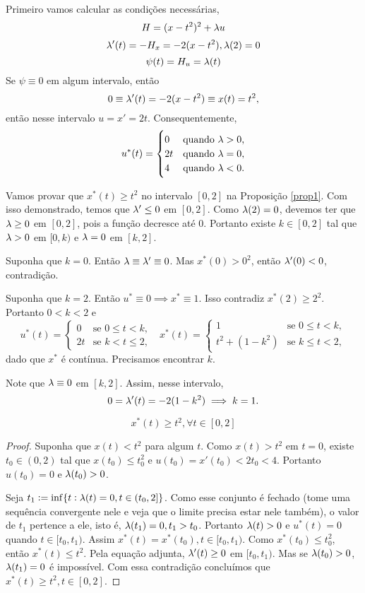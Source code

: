 Primeiro vamos calcular as condições necessárias, 
$$
H = (x - t^2)^2 + \lambda u 
$$
$$
\lambda '(t) = -H_x = -2(x - t^2), \lambda(2) = 0
$$
$$
\psi(t) = H_u = \lambda(t)
$$
Se $\psi \equiv 0$ em algum intervalo, então 
$$
0 \equiv \lambda '(t) = -2(x - t^2) \equiv x(t) =  t^2,
$$
então nesse intervalo $u = x' = 2t$.
Consequentemente, 
$$
u^*(t) = \begin{cases}
    0 &\text{quando }\lambda > 0, \\
    2t &\text{quando }\lambda = 0, \\
    4 &\text{quando }\lambda < 0.
\end{cases}
$$

Vamos provar que $x^*(t) \ge t^2$ no intervalo $[0,2]$ na Proposição
\ref{prop1}. Com isso demonstrado, temos que $\lambda ' \le 0$ em $[0,2]$. Como
$\lambda(2) = 0$, devemos ter que $\lambda \ge 0$ em $[0,2]$, pois a função decresce
até $0$. Portanto existe $k \in [0,2]$ tal que $\lambda > 0$ em $[0,k)$ e $\lambda = 0$ em $[k,2]$. 

Suponha que $k = 0$. Então $\lambda \equiv \lambda ' \equiv 0$. Mas $x^*(0) > 0^2$,
então $\lambda '(0) < 0$, contradição. 

Suponha que $k = 2$. Então $u^* \equiv 0 \implies x^* \equiv 1$. Isso
contradiz $x^*(2) \ge 2^2$. Portanto $0 < k < 2$ e 
\begin{equation}
    \label{eq1:u-star}
    u^*(t) = \begin{cases}
        0 &\text{se }0 \le t < k, \\
        2t &\text{se }k < t \le 2, 
    \end{cases}\text{  }x^*(t) = \begin{cases}
        1 &\text{se }0 \le t < k, \\
        t^2 + (1 - k^2) &\text{se }k \le t < 2,
    \end{cases}    
\end{equation}
dado que $x^*$ é contínua. Precisamos encontrar $k$. 

Note que $\lambda \equiv 0$ em $[k,2]$. Assim, nesse intervalo, 
$$
0 = \lambda '(t) = - 2(1 - k^2) \implies k = 1.
$$

\begin{proposition}
    \label{prop1}
    $$x^*(t) \ge t^2, \forall t \in [0,2]$$
\end{proposition}

\begin{proof}
    Suponha que $x(t) < t^2$ para algum $t$. Como $x(t) > t^2$ em $t=0$,
    existe $t_0 \in (0,2)$ tal que $x(t_0) \le t_0^2$ e $u(t_0) = x'(t_0) <
    2t_0 < 4$. Portanto $u(t_0) = 0$ e $\lambda(t_0) > 0$. 

    Seja $t_1 := \inf\{t: \lambda(t) = 0, t \in (t_0, 2]\}$. Como esse conjunto é
    fechado (tome uma sequência convergente nele e veja que o limite precisa estar
    nele também), o valor de $t_1$ pertence a ele, isto é, $\lambda(t_1) = 0, t_1 > t_0$.
    Portanto $\lambda(t) > 0$ e $u^*(t) = 0$ quando $t \in [t_0,
    t_1)$. Assim $x^*(t) = x^*(t_0), t \in [t_0, t_1)$. Como $x^*(t_0) \le
    t_0^2$, então $x^*(t) \le t^2$. Pela equação adjunta, $\lambda '(t) \ge 0$ em
    $[t_0, t_1)$. Mas se $\lambda(t_0) > 0$, $\lambda(t_1) = 0$ é impossível. Com essa
    contradição concluímos que $x^*(t) \ge t^2, t \in [0,2]$.   
\end{proof}

